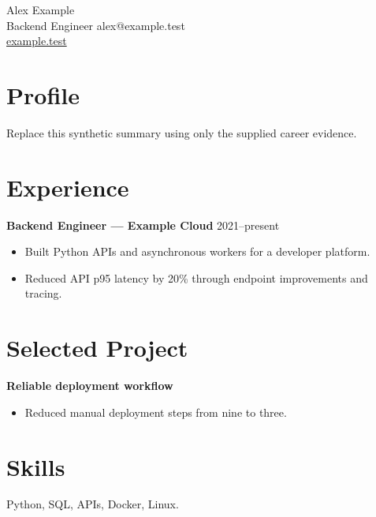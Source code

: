 \documentclass[10pt,a4paper]{article}
\begin{document}
{\LARGE Alex Example}\\[3pt]
Backend Engineer \hfill alex@example.test\\
\href{https://example.test}{example.test}
\section*{Profile}
Replace this synthetic summary using only the supplied career evidence.
\section*{Experience}
\textbf{Backend Engineer --- Example Cloud} \hfill 2021--present
\begin{itemize}
  \item Built Python APIs and asynchronous workers for a developer platform.
  \item Reduced API p95 latency by 20\% through endpoint improvements and tracing.
\end{itemize}
\section*{Selected Project}
\textbf{Reliable deployment workflow}
\begin{itemize}
  \item Reduced manual deployment steps from nine to three.
\end{itemize}
\section*{Skills}
Python, SQL, APIs, Docker, Linux.
\end{document}
